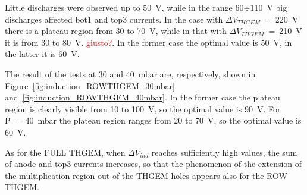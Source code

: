 \documentclass[a4paper, 11 pt]{article}
\newcommand{\Vind}{$\Delta V_{ind}$}
\newcommand{\Vthgem}{$\Delta V_{THGEM}$}
\begin{document}
Little discharges were observed up to 50~V, while in the range 60$\div$110~V big discharges affected bot1 and top3 currents.
In the case with \Vthgem~=~220~V there is a plateau region from 30 to 70~V, while in that with \Vthgem~=~210~V it is from 30 to 80~V.
\textcolor{red}{giusto?}.
In the former case the optimal value is 50~V, in the latter it is 60~V.



The result of the tests at 30 and 40~mbar are, respectively, shown in Figure~\ref{fig:induction_ROWTHGEM_30mbar} and~\ref{fig:induction_ROWTHGEM_40mbar}.
In the former case the plateau region is clearly visible from 10 to 100~V, so the optimal value is 90~V.
For P~=~40~mbar the plateau region ranges from 20 to 70~V, so the optimal value is 60~V.

As for the FULL THGEM, when \Vind{} reaches sufficiently high values, the sum of anode and top3 currents increases, so that the phenomenon of the extension of the multiplication region out of the THGEM holes appears also for the ROW THGEM.
\end{document}
